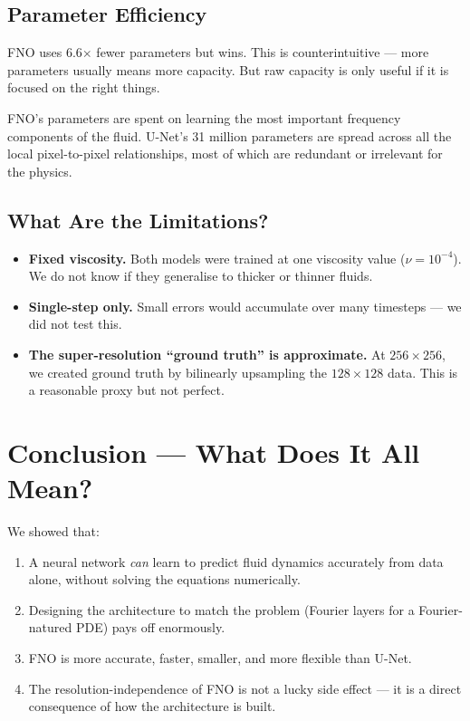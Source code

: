 \documentclass[acmsmall,nonacm]{acmart}
\begin{document}
\subsection{Parameter Efficiency}

FNO uses 6.6$\times$ fewer parameters but wins.
This is counterintuitive --- more parameters usually means more capacity.
But raw capacity is only useful if it is focused on the right things.

FNO's parameters are spent on learning the most important frequency components
of the fluid.
U-Net's 31 million parameters are spread across all the local pixel-to-pixel
relationships, most of which are redundant or irrelevant for the physics.

\subsection{What Are the Limitations?}

\begin{itemize}
  \item \textbf{Fixed viscosity.}
        Both models were trained at one viscosity value ($\nu = 10^{-4}$).
        We do not know if they generalise to thicker or thinner fluids.
  \item \textbf{Single-step only.}
        Small errors would accumulate over many timesteps --- we did not test this.
  \item \textbf{The super-resolution ``ground truth'' is approximate.}
        At $256 \times 256$, we created ground truth by bilinearly upsampling
        the $128 \times 128$ data. This is a reasonable proxy but not perfect.
\end{itemize}

\section{Conclusion --- What Does It All Mean?}

We showed that:
\begin{enumerate}
  \item A neural network \emph{can} learn to predict fluid dynamics accurately
        from data alone, without solving the equations numerically.
  \item Designing the architecture to match the problem (Fourier layers for a
        Fourier-natured PDE) pays off enormously.
  \item FNO is more accurate, faster, smaller, and more flexible than U-Net.
  \item The resolution-independence of FNO is not a lucky side effect --- it
        is a direct consequence of how the architecture is built.
\end{enumerate}
\end{document}
